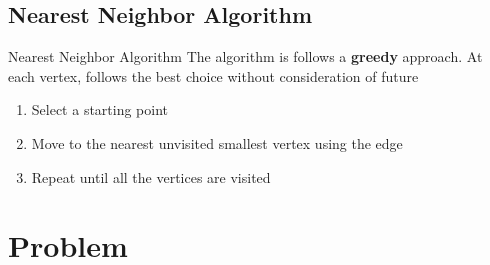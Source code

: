 \documentclass{beamer}
\begin{document}
\subsection{Nearest Neighbor Algorithm}
\begin{frame}{Nearest Neighbor Algorithm}
    The algorithm is follows a \textbf{greedy} approach. At each vertex, follows the best choice without consideration of future\newline
    \begin{enumerate}
        \item Select a starting point
        \item Move to the nearest unvisited smallest vertex using the edge
        \item Repeat until all the vertices are visited
    \end{enumerate} 
\end{frame}
\section{Problem}
% 
% 
\end{document}

